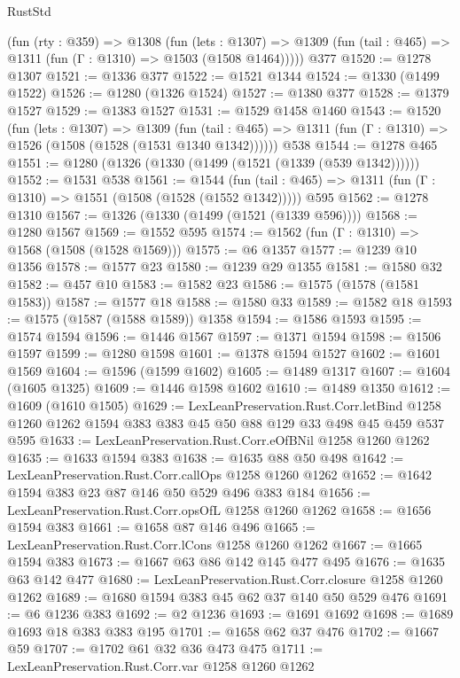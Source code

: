 \begin{lexlean}{RustStd}
\begin{coremodule}
{\begin{coremodule}
{{{{{{{{{{{{    (fun (rty : @359) =>
    @1308
      (fun (lets : @1307) =>
      @1309 (fun (tail : @465) => @1311 (fun (Γ : @1310) => @1503 (@1508 @1464)))))
    @377
@1520 := @1278 @1307
@1521 := @1336 @377
@1522 := @1521 @1344
@1524 := @1330 (@1499 @1522)
@1526 := @1280 (@1326 @1524)
@1527 := @1380 @377
@1528 := @1379 @1527
@1529 := @1383 @1527
@1531 := @1529 @1458 @1460
@1543 := @1520
    (fun (lets : @1307) =>
    @1309
      (fun (tail : @465) => @1311 (fun (Γ : @1310) => @1526 (@1508 (@1528 (@1531 @1340 @1342))))))
    @538
@1544 := @1278 @465
@1551 := @1280 (@1326 (@1330 (@1499 (@1521 (@1339 (@539 @1342))))))
@1552 := @1531 @538
@1561 := @1544
    (fun (tail : @465) => @1311 (fun (Γ : @1310) => @1551 (@1508 (@1528 (@1552 @1342)))))
    @595
@1562 := @1278 @1310
@1567 := @1326 (@1330 (@1499 (@1521 (@1339 @596))))
@1568 := @1280 @1567
@1569 := @1552 @595
@1574 := @1562 (fun (Γ : @1310) => @1568 (@1508 (@1528 @1569)))
@1575 := @6 @1357
@1577 := @1239 @10 @1356
@1578 := @1577 @23
@1580 := @1239 @29 @1355
@1581 := @1580 @32
@1582 := @457 @10
@1583 := @1582 @23
@1586 := @1575 (@1578 (@1581 @1583))
@1587 := @1577 @18
@1588 := @1580 @33
@1589 := @1582 @18
@1593 := @1575 (@1587 (@1588 @1589)) @1358
@1594 := @1586 @1593
@1595 := @1574 @1594
@1596 := @1446 @1567
@1597 := @1371 @1594
@1598 := @1506 @1597
@1599 := @1280 @1598
@1601 := @1378 @1594 @1527
@1602 := @1601 @1569
@1604 := @1596 (@1599 @1602)
@1605 := @1489 @1317
@1607 := @1604 (@1605 @1325)
@1609 := @1446 @1598 @1602
@1610 := @1489 @1350
@1612 := @1609 (@1610 @1505)
@1629 := LexLeanPreservation.Rust.Corr.letBind
    @1258
    @1260
    @1262
    @1594
    @383
    @383
    @45
    @50
    @88
    @129
    @33
    @498
    @45
    @459
    @537
    @595
@1633 := LexLeanPreservation.Rust.Corr.eOfBNil @1258 @1260 @1262
@1635 := @1633 @1594 @383
@1638 := @1635 @88 @50 @498
@1642 := LexLeanPreservation.Rust.Corr.callOps @1258 @1260 @1262
@1652 := @1642 @1594 @383 @23 @87 @146 @50 @529 @496 @383 @184
@1656 := LexLeanPreservation.Rust.Corr.opsOfL @1258 @1260 @1262
@1658 := @1656 @1594 @383
@1661 := @1658 @87 @146 @496
@1665 := LexLeanPreservation.Rust.Corr.lCons @1258 @1260 @1262
@1667 := @1665 @1594 @383
@1673 := @1667 @63 @86 @142 @145 @477 @495
@1676 := @1635 @63 @142 @477
@1680 := LexLeanPreservation.Rust.Corr.closure @1258 @1260 @1262
@1689 := @1680 @1594 @383 @45 @62 @37 @140 @50 @529 @476
@1691 := @6 @1236 @383
@1692 := @2 @1236
@1693 := @1691 @1692
@1698 := @1689 @1693 @18 @383 @383 @195
@1701 := @1658 @62 @37 @476
@1702 := @1667 @59
@1707 := @1702 @61 @32 @36 @473 @475
@1711 := LexLeanPreservation.Rust.Corr.var @1258 @1260 @1262
}}}}}}}}}}}}
\end{coremodule}}
\end{coremodule}
\end{lexlean}
